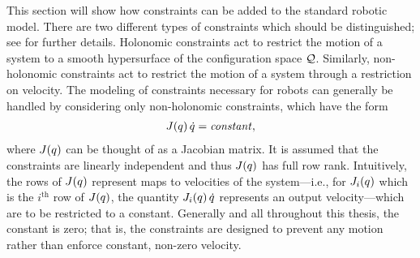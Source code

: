 This section will show how constraints can be added to the standard robotic
model.
%
There are two different types of constraints which should be distinguished; see
\cite[Ch. 6]{Murray1994} for further details.
%
Holonomic constraints act to restrict the motion of a system to a smooth
hypersurface of the configuration space $\mathcal{Q}$.
%
Similarly, non-holonomic constraints act to restrict the motion of a system
through a restriction on velocity.
%
The modeling of constraints necessary for robots can generally be handled by
considering only non-holonomic constraints, which have the form
\begin{align}
  \label{eq:holocon}
  J(q) \, \dot{q} = \mathit{constant},
\end{align}
where $J(q)$ can be thought of as a Jacobian matrix.
%
It is assumed that the constraints are linearly independent and thus $J(q)$
has full row rank.
%
Intuitively, the rows of $J(q)$ represent maps to velocities of the
system---i.e., for $J_{i}(q)$ which is the $i^{\mathrm{th}}$ row of
$J(q)$, the quantity $J_{i}(q) \, \dot{q}$ represents an output
velocity---which are to be restricted to a constant.
%
Generally and all throughout this thesis, the constant is zero; that is, the
constraints are designed to prevent any motion rather than enforce constant,
non-zero velocity.


